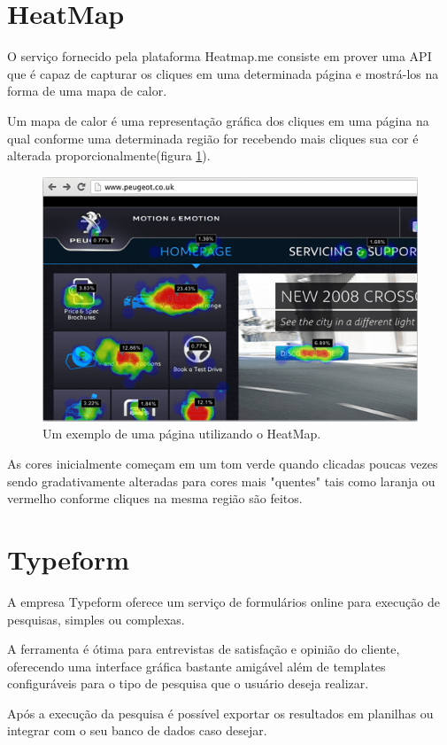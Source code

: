 \section{HeatMap}
\par O serviço fornecido pela plataforma Heatmap.me consiste em prover uma API que é capaz de capturar os cliques em uma determinada página e mostrá-los na forma de uma mapa de calor.
\par Um mapa de calor é uma representação gráfica dos cliques em uma página na qual conforme uma determinada região for recebendo mais cliques sua cor é alterada proporcionalmente(figura \ref{fig:heatmap_explanation}).
\begin{figure}[htb]
\centering
\includegraphics[width=15cm]{figuras/heatmap_explanation}
\caption{\label{fig:heatmap_explanation} Um exemplo de uma página utilizando o HeatMap.}
\end{figure}
\par As cores inicialmente começam em um tom verde quando clicadas poucas vezes sendo gradativamente alteradas para cores mais "quentes" tais como laranja ou vermelho conforme cliques na mesma região são feitos.

\section{Typeform}
\par A empresa Typeform oferece um serviço de formulários online para execução de pesquisas, simples ou complexas.
\par A ferramenta é ótima para entrevistas de satisfação e opinião do cliente, oferecendo uma interface gráfica bastante amigável além de templates configuráveis para o tipo de pesquisa que o usuário deseja realizar.
\par Após a execução da pesquisa é possível exportar os resultados em planilhas ou integrar com o seu banco de dados caso desejar.
